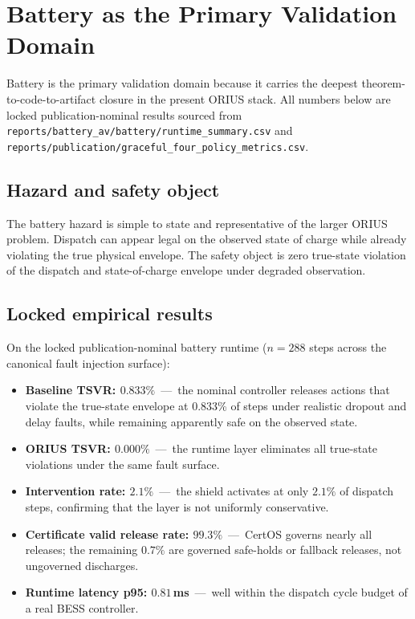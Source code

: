 \section{Battery as the Primary Validation Domain}
\label{sec:ieee-battery}

Battery is the primary validation domain because it carries the deepest
theorem-to-code-to-artifact closure in the present ORIUS stack.
All numbers below are locked publication-nominal results sourced from
\texttt{reports/battery\_av/battery/\allowbreak{}runtime\_summary.csv} and
\texttt{reports/publication/\allowbreak{}graceful\_four\_policy\_metrics.csv}.

\subsection{Hazard and safety object}
The battery hazard is simple to state and representative of the larger ORIUS
problem.  Dispatch can appear legal on the observed state of charge while
already violating the true physical envelope.  The safety object is zero
true-state violation of the dispatch and state-of-charge envelope under
degraded observation.

\subsection{Locked empirical results}
On the locked publication-nominal battery runtime ($n=288$ steps across the
canonical fault injection surface):

\begin{itemize}[leftmargin=1.25em,itemsep=0.2em]
\item \textbf{Baseline TSVR: $0.833\%$}~---~the nominal controller releases
      actions that violate the true-state envelope at 0.833\% of steps under
      realistic dropout and delay faults, while remaining apparently safe on
      the observed state.
\item \textbf{ORIUS TSVR: $0.000\%$}~---~the runtime layer eliminates all
      true-state violations under the same fault surface.
\item \textbf{Intervention rate: $2.1\%$}~---~the shield activates at only
      $2.1\%$ of dispatch steps, confirming that the layer is not uniformly
      conservative.
\item \textbf{Certificate valid release rate: $99.3\%$}~---~CertOS governs
      nearly all releases; the remaining $0.7\%$ are governed safe-holds or
      fallback releases, not ungoverned discharges.
\item \textbf{Runtime latency p95: $0.81$\,ms}~---~well within the dispatch
      cycle budget of a real BESS controller.
\end{itemize}

